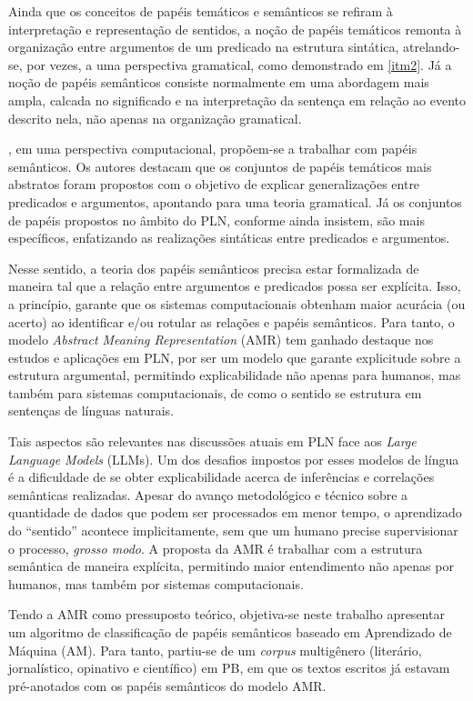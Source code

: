 Ainda que os conceitos de papéis temáticos e semânticos se refiram à
interpretação e representação de sentidos, a noção de papéis temáticos
remonta à organização entre argumentos de um predicado na estrutura
sintática, atrelando-se, por vezes, a uma perspectiva gramatical, como
demonstrado em \ref{itm2}. Já a noção de papéis semânticos consiste normalmente
em uma abordagem mais ampla, calcada no significado e na interpretação
da sentença em relação ao evento descrito nela, não apenas na
organização gramatical.

\textcite{gildea2002}, em uma perspectiva computacional, propõem-se a
trabalhar com papéis semânticos. Os autores destacam que os conjuntos de
papéis temáticos mais abstratos foram propostos com o objetivo de
explicar generalizações entre predicados e argumentos, apontando para
uma teoria gramatical. Já os conjuntos de papéis propostos no âmbito do
PLN, conforme ainda insistem, são mais específicos, enfatizando as
realizações sintáticas entre predicados e argumentos.

Nesse sentido, a teoria dos papéis semânticos precisa estar formalizada
de maneira tal que a relação entre argumentos e predicados possa ser
explícita. Isso, a princípio, garante que os sistemas computacionais
obtenham maior acurácia (ou acerto) ao identificar e/ou rotular as
relações e papéis semânticos. Para tanto, o modelo \emph{Abstract
Meaning Representation} (AMR) \cite{banarescu2013,weischedel2013} tem ganhado destaque nos estudos e aplicações em PLN,
por ser um modelo que garante explicitude sobre a estrutura argumental,
permitindo explicabilidade não apenas para humanos, mas também para
sistemas computacionais, de como o sentido se estrutura em sentenças de
línguas naturais.

Tais aspectos são relevantes nas discussões atuais em PLN face aos
\emph{Large Language Models} (LLMs). Um dos desafios impostos por esses
modelos de língua é a dificuldade de se obter explicabilidade acerca de
inferências e correlações semânticas realizadas. Apesar do avanço
metodológico e técnico sobre a quantidade de dados que podem ser
processados em menor tempo, o aprendizado do ``sentido'' acontece
implicitamente, sem que um humano precise supervisionar o processo,
\emph{grosso modo}. A proposta da AMR é trabalhar com a estrutura
semântica de maneira explícita, permitindo maior entendimento não apenas
por humanos, mas também por sistemas computacionais.

Tendo a AMR como pressuposto teórico, objetiva-se neste trabalho
apresentar um algoritmo de classificação de papéis semânticos baseado em
Aprendizado de Máquina (AM). Para tanto, partiu-se de um \emph{corpus}
multigênero (literário, jornalístico, opinativo e científico) em PB, em
que os textos escritos já estavam pré-anotados com os papéis semânticos
do modelo AMR.

